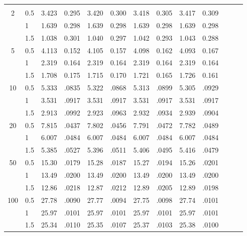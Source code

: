 \begin{table}[t]
\begin{tabular}{clccclccccccc}
		&  \\ 
		2 & 0.5 & 3.423 & 0.295 & 3.420 & 0.300 & 3.418 & 0.305 & 3.417 & 0.309 &  & 
		&  \\ 
		& 1 & 1.639 & 0.298 & 1.639 & 0.298 & 1.639 & 0.298 & 1.639 & 0.298 &  &  & 
		\\ 
		& 1.5 & 1.038 & 0.301 & 1.040 & 0.297 & 1.042 & 0.293 & 1.043 & 0.288 &  & 
		&  \\ 
		5 & 0.5 & 4.113 & 0.152 & 4.105 & 0.157 & 4.098 & 0.162 & 4.093 & 0.167 &  & 
		&  \\ 
		& 1 & 2.319 & 0.164 & 2.319 & 0.164 & 2.319 & 0.164 & 2.319 & 0.164 &  &  & 
		\\ 
		& 1.5 & 1.708 & 0.175 & 1.715 & 0.170 & 1.721 & 0.165 & 1.726 & 0.161 &  & 
		&  \\ 
		10 & 0.5 & 5.333 & .0835 & 5.322 & .0868 & 5.313 & .0899 & 5.305 & .0929 & 
		&  &  \\ 
		& 1 & 3.531 & .0917 & 3.531 & .0917 & 3.531 & .0917 & 3.531 & .0917 &  &  & 
		\\ 
		& 1.5 & 2.913 & .0992 & 2.923 & .0963 & 2.932 & .0934 & 2.939 & .0904 &  & 
		&  \\ 
		20 & 0.5 & 7.815 & .0437 & 7.802 & .0456 & 7.791 & .0472 & 7.782 & .0489 & 
		&  &  \\ 
		& 1 & 6.007 & .0484 & 6.007 & .0484 & 6.007 & .0484 & 6.007 & .0484 &  &  & 
		\\ 
		& 1.5 & 5.385 & .0527 & 5.396 & .0511 & 5.406 & .0495 & 5.416 & .0479 &  & 
		&  \\ 
		50 & 0.5 & 15.30 & .0179 & 15.28 & .0187 & 15.27 & .0194 & 15.26 & .0201 & 
		&  &  \\ 
		& 1 & 13.49 & .0200 & 13.49 & .0200 & 13.49 & .0200 & 13.49 & .0200 &  &  & 
		\\ 
		& 1.5 & 12.86 & .0218 & 12.87 & .0212 & 12.89 & .0205 & 12.89 & .0198 &  & 
		&  \\ 
		100 & 0.5 & 27.78 & .0090 & 27.77 & .0094 & 27.75 & .0098 & 27.74 & .0101 & 
		&  &  \\ 
		& 1 & 25.97 & .0101 & 25.97 & .0101 & 25.97 & .0101 & 25.97 & .0101 &  &  & 
		\\ 
		& 1.5 & 25.34 & .0110 & 25.35 & .0107 & 25.37 & .0103 & 25.38 & .0100 &  & 
		& \\
		\hline
	\end{tabular}%
	\label{table_poiseuille_tube_compare}
\end{table}



